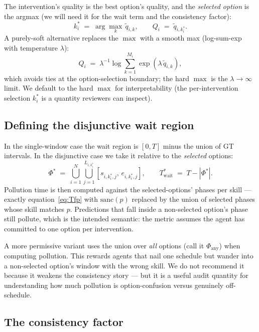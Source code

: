 \documentclass[11pt]{article}
\newcommand{\Tt}{T}
\newcommand{\Twait}{T_{\text{wait}}}
\begin{document}
The intervention's quality is the best option's quality, and the
\emph{selected option} is the argmax (we will need it for the wait
term and the consistency factor):
\begin{equation}
  k^*_i \;=\; \arg\max_{k}\, \tilde q_{i,k}, \qquad
  Q_i \;=\; \tilde q_{i,k^*_i}.
\end{equation}
A purely-soft alternative replaces the $\max$ with a smooth max
(log-sum-exp with temperature $\lambda$):
\begin{equation}
  Q_i \;=\; \lambda^{-1} \log \sum_{k=1}^{M_i} \exp(\lambda\,\tilde q_{i,k}),
\end{equation}
which avoids ties at the option-selection boundary; the hard $\max$
is the $\lambda \to \infty$ limit. We default to the hard $\max$ for
interpretability (the per-intervention selection $k^*_i$ is a
quantity reviewers can inspect).

\subsection{Defining the disjunctive wait region}
\label{sec:disj-wait}

In the single-window case the wait region is $[0, \Tt]$ minus the
union of GT intervals. In the disjunctive case we take it relative
to the \emph{selected} options:
\begin{equation}
  \Phi^* \;=\; \bigcup_{i=1}^N \bigcup_{j=1}^{L_{i,k^*_i}}
              [s_{i,k^*_i,j},\,e_{i,k^*_i,j}],
  \qquad
  \Twait^* \;=\; \Tt - |\Phi^*|.
\end{equation}
Pollution time is then computed against the selected-options'
phases per skill --- exactly equation~\eqref{eq:Tfp} with
$\mathrm{sanc}(p)$ replaced by the union of selected phases whose
skill matches $p$. Predictions that fall inside a non-selected
option's phase still pollute, which is the intended semantic: the
metric assumes the agent has committed to one option per
intervention.

A more permissive variant uses the union over \emph{all} options
(call it $\Phi_{\text{any}}$) when computing pollution. This rewards
agents that nail one schedule but wander into a non-selected
option's window with the wrong skill. We do not recommend it because
it weakens the consistency story --- but it is a useful audit
quantity for understanding how much pollution is option-confusion
versus genuinely off-schedule.

\subsection{The consistency factor}
\label{sec:disj-cons}
\end{document}
